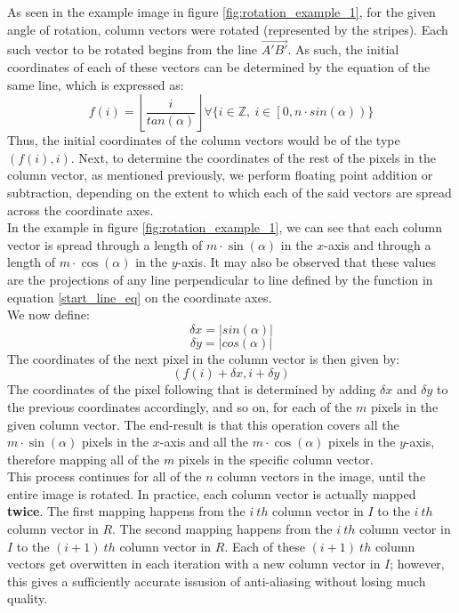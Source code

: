 \documentclass[conference]{IEEEtran}
\begin{document}
As seen in the example image in figure \ref{fig:rotation_example_1}, for the given angle of rotation, column vectors were rotated (represented by the stripes). Each such vector to be rotated begins from the line $\overrightarrow{A'B'}$. As such, the initial coordinates of each of these vectors can be determined by the equation of the same line, which is expressed as:
\begin{equation}
    \label{start_line_eq}
    f(i) = \left\lfloor \frac{i}{tan(\alpha)} \right\rfloor \forall \{i \in \mathbb{Z},\> i \in \left[ 0, n \cdot sin(\alpha) \right)\}
\end{equation}
Thus, the initial coordinates of the column vectors would be of the type $(f(i), i)$. Next, to determine the coordinates of the rest of the pixels in the column vector, as mentioned previously, we perform floating point addition or subtraction, depending on the extent to which each of the said vectors are spread across the coordinate axes.\\
In the example in figure \ref{fig:rotation_example_1}, we can see that each column vector is spread through a length of $m \cdot \sin(\alpha)$ in the $x$-axis and through a length of $m \cdot \cos(\alpha)$ in the $y$-axis. It may also be observed that these values are the projections of any line perpendicular to line defined by the function in equation \ref{start_line_eq} on the coordinate axes.\\
We now define:
$$\delta x = \left\lvert sin(\alpha)\right\rvert$$
$$\delta y = \left\lvert cos(\alpha)\right\rvert$$
The coordinates of the next pixel in the column vector is then given by:
$$(f(i) + \delta x, i + \delta y)$$
The coordinates of the pixel following that is determined by adding $\delta x$ and $\delta y$ to the previous coordinates accordingly, and so on, for each of the $m$ pixels in the given column vector. The end-result is that this operation covers all the $m \cdot \sin(\alpha)$ pixels in the $x$-axis and all the $m \cdot \cos(\alpha)$ pixels in the $y$-axis, therefore mapping all of the $m$ pixels in the specific column vector.\\
This process continues for all of the $n$ column vectors in the image, until the entire image is rotated. In practice, each column vector is actually mapped \textbf{twice}. The first mapping happens from the $i\>th$ column vector in $I$ to the $i\>th$ column vector in $R$. The second mapping happens from the $i\>th$ column vector in $I$ to the $(i+1)\>th$ column vector in $R$. Each of these $(i+1)\>th$ column vectors get overwitten in each iteration with a new column vector in $I$; however, this gives a sufficiently accurate issusion of anti-aliasing without losing much quality.
\end{document}
